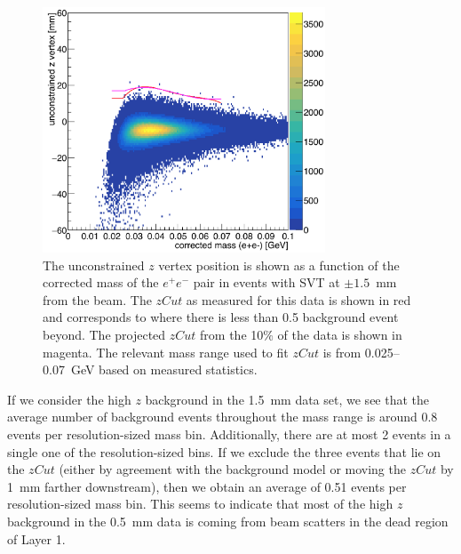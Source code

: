 \begin{figure}[htb]
  \centering
      \includegraphics[width=0.75\textwidth]{pics/results/zVm_1p5mm.png}
  \caption[Vertex position vs mass for the 100$\%$ L1L1 data at 1.5~mm]{The unconstrained $z$ vertex position is shown as a function of the corrected mass of the $e^+e^-$ pair in events with SVT at $\pm1.5$~mm from the beam. The $zCut$ as measured for this data is shown in red and corresponds to where there is less than 0.5 background event beyond. The projected $zCut$ from the 10$\%$ of the data is shown in magenta. The relevant mass range used to fit $zCut$ is from 0.025--0.07~GeV based on measured statistics.}
  \label{fig:zVm1p5_ub}
\end{figure} 

If we consider the high $z$ background in the 1.5~mm data set, we see that the average number of background events throughout the mass range is around 0.8 events per resolution-sized mass bin. Additionally, there are at most 2 events in a single one of the resolution-sized bins. If we exclude the three events that lie on the $zCut$ (either by agreement with the background model or moving the $zCut$ by 1~mm farther downstream), then we obtain an average of 0.51 events per resolution-sized mass bin. This seems to indicate that most of the high $z$ background in the 0.5~mm data is coming from beam scatters in the dead region of Layer 1.  

